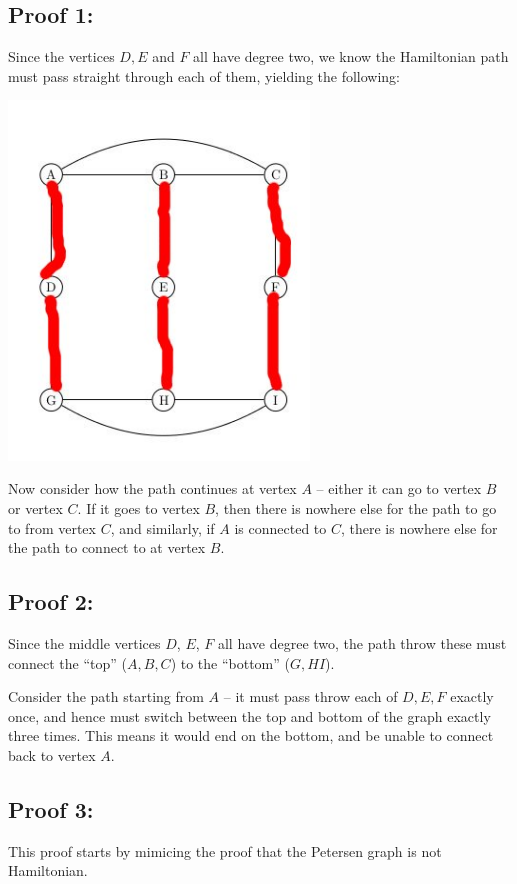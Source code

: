 \documentclass{amsart}
\begin{document}
\subsection{Proof 1:}

Since the vertices $D, E$ and $F$ all have degree two, we know the Hamiltonian path must pass straight through each of them, yielding the following:

\begin{center} 
\includegraphics[width=8cm]{PS1S2.jpg}
\end{center}

Now consider how the path continues at vertex $A$ -- either it can go to vertex $B$ or vertex $C$.  If it goes to vertex $B$, then there is nowhere else for the path to go to from vertex $C$, and similarly, if $A$ is connected to $C$, there is nowhere else for the path to connect to at vertex $B$.

\subsection{Proof 2:}

Since the middle vertices $D$, $E$, $F$ all have degree two, the path throw these must connect the ``top'' ($A, B, C$) to the ``bottom'' ($G, H I$).

Consider the path starting from $A$ -- it must pass throw each of $D, E, F$ exactly once, and hence must switch between the top and bottom of the graph exactly three times.  This means it would end on the bottom, and be unable to connect back to vertex $A$.

\subsection{Proof 3:}
This proof starts by mimicing the proof that the Petersen graph is not Hamiltonian.
\end{document}
